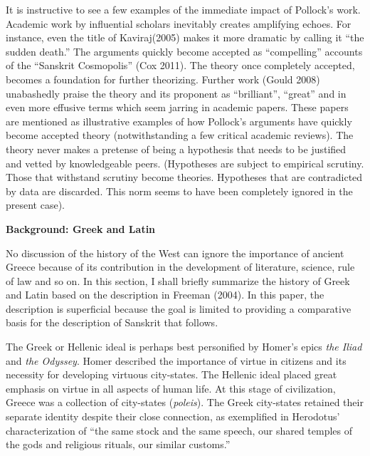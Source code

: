 It is instructive to see a few examples of the immediate impact of Pollock’s work. Academic work by influential scholars inevitably creates amplifying echoes. For instance, even the title of Kaviraj(2005) makes it more dramatic by calling it “the sudden death.” The arguments quickly become accepted as “compelling” accounts of the “Sanskrit Cosmopolis” (Cox 2011). The theory once completely accepted, becomes a foundation for further theorizing. Further work (Gould 2008) unabashedly praise the theory and its proponent as “brilliant”, “great” and in even more effusive terms which seem jarring in academic papers. These papers are mentioned as illustrative examples of how Pollock’s arguments have quickly become accepted theory (notwithstanding a few critical academic reviews). The theory never makes a pretense of being a hypothesis that needs to be justified and vetted by knowledgeable peers. (Hypotheses are subject to empirical scrutiny. Those that withstand scrutiny become theories. Hypotheses that are contradicted by data are discarded. This norm seems to have been completely ignored in the present case). 
\medskip

{\bf Background: Greek and Latin}
\smallskip

No discussion of the history of the West can ignore the importance of ancient Greece because of its contribution in the development of literature, science, rule of law and so on. In this section, I shall briefly summarize the history of Greek and Latin based on the description in Freeman (2004). In this paper, the description is superficial because the goal is limited to providing a comparative basis for the description of Sanskrit that follows. 


The Greek or Hellenic ideal is perhaps best personified by Homer’s epics {\it the Iliad} and {\it the Odyssey}. Homer described the importance of virtue in citizens and its necessity for developing virtuous city-states. The Hellenic ideal placed great emphasis on virtue in all aspects of human life. At this stage of civilization, Greece was a collection of city-states ({\it poleis}). The Greek city-states retained their separate identity despite their close connection, as exemplified in Herodotus’ characterization of “the same stock and the same speech, our shared temples of the gods and religious rituals, our similar customs.”

